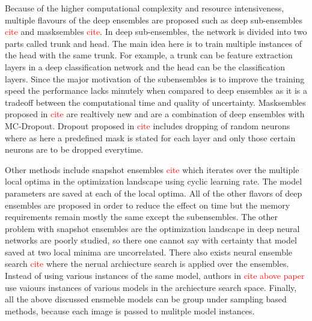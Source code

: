     Because of the higher computational complexity and resource intensiveness, multiple flavours of the deep ensembles are proposed such as deep sub-ensembles \textcolor{red}{cite} and masksembles \textcolor{red}{cite}.
    In deep sub-ensembles, the network is divided into two parts called trunk and head.
    The main idea here is to train multiple instances of the head with the same trunk. For example, a trunk can be feature extraction layers in a deep classification network and the head can be the classification layers.
    Since the major motivation of the subensembles is to improve the training speed the performance lacks minutely when compared to deep ensembles as it is a tradeoff between the computational time and quality of uncertainty.
    Masksembles proposed in \textcolor{red}{cite} are realtively new and are a combination of deep ensembles with MC-Dropout.
    Dropout proposed in \textcolor{red}{cite} includes dropping of random neurons where as here a predefined mask is stated for each layer and only those certain neurons are to be dropped everytime.

    Other methods include snapshot ensembles \textcolor{red}{cite} which iterates over the multiple local optima in the optimization landscape using cyclic learning rate. 
    The model parameters are saved at each of the local optima. 
    All of the other flavors of deep ensembles are proposed in order to reduce the effect on time but the memory requirements remain mostly the same except the subensembles.
    The other problem with snapshot ensembles are the optimization landscape in deep neural networks are poorly studied, so there one cannot say with certainty that model saved at two local minima are uncorrelated.
    There also exists neural ensemble search \textcolor{red}{cite} where the nerual archiecture search is applied over the ensembles.
    Instead of using various instances of the same model, authors in \textcolor{red}{cite above paper} use vaiours instances of various models in the archiecture search space.
    Finally, all the above discussed ensmeble models can be group under sampling based methods, because each image is passed to mulitple model instances.    

